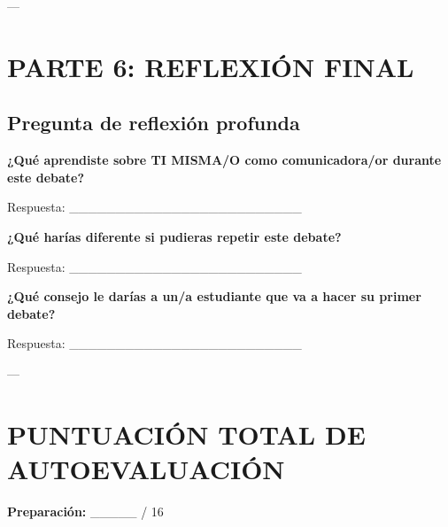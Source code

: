 \documentclass[a4paper,11pt]{article}
\begin{document}
\vspace{0.2cm}

---

\vspace{0.2cm}

\section{PARTE 6: REFLEXIÓN FINAL}

\vspace{0.2cm}

\subsection{Pregunta de reflexión profunda}

\vspace{0.2cm}

\textbf{¿Qué aprendiste sobre TI MISMA/O como comunicadora/or durante este debate?}

\vspace{0.2cm}

Respuesta: _________________________

\vspace{0.2cm}

\textbf{¿Qué harías diferente si pudieras repetir este debate?}

\vspace{0.2cm}

Respuesta: _________________________

\vspace{0.2cm}

\textbf{¿Qué consejo le darías a un/a estudiante que va a hacer su primer debate?}

\vspace{0.2cm}

Respuesta: _________________________

\vspace{0.2cm}

---

\vspace{0.2cm}

\section{PUNTUACIÓN TOTAL DE AUTOEVALUACIÓN}

\vspace{0.2cm}

\textbf{Preparación:} _____ / 16
\end{document}

